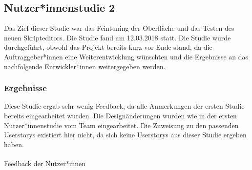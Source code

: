 \subsection{Nutzer*innenstudie 2}
Das Ziel dieser Studie war das Feintuning der Oberfläche und das Testen des neuen
Skripteditors. Die Studie fand am 12.03.2018 statt. Die Studie wurde durchgeführt,
obwohl das Projekt bereits kurz vor Ende stand, da die Auftraggeber*innen eine
Weiterentwicklung wünschten und die Ergebnisse an das nachfolgende Entwickler*innen
weitergegeben werden.


\subsubsection{Ergebnisse}
Diese Studie ergab sehr wenig Feedback, da alle Anmerkungen der ersten Studie bereits
eingearbeitet wurden. Die Designänderungen wurden wie in der ersten Nutzer*innenstudie
vom Team eingearbeitet. Die Zuweisung zu den passenden Userstorys existiert hier nicht,
da sich keine Userstorys aus dieser Studie ergeben haben.
\\\\
{\large Feedback der Nutzer*innen\\}

